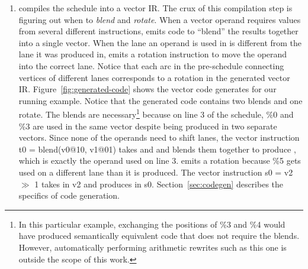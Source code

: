 \begin{enumerate}
    \item \system compiles the schedule into a vector IR. The crux of this compilation step is figuring out when to {\em blend} and {\em rotate}. When a vector operand requires values from several different instructions, \system emits code to ``blend'' the results together into a single vector.
    When the lane an operand is used in is different from the lane it was produced in, \system emits a rotation instruction to move the operand into the correct lane. Notice that each arc in the pre-schedule connecting vertices of different lanes corresponds to a rotation in the generated vector IR.
    Figure~\ref{fig:generated-code} shows the vector code \system generates for our running example.
    Notice that the generated code contains two blends and one rotate.
    The blends are necessary\footnote{In this particular example, exchanging the positions of {\sf \%3} and {\sf \%4} would have produced semantically equivalent code that does not require the blends. However, automatically performing arithmetic rewrites such as this one is outside the scope of this work.} because on line 3 of the schedule, {\sf \%0} and {\sf \%3} are used in the same vector despite being produced in two separate vectors. 
    Since none of the operands need to shift lanes, the vector instruction {\sf t0 = blend(v0@10, v1@01)} takes {\sf [\%0, \%4]} and {\sf [\%1, \%3]} and blends them together to produce {\sf [\%0, \%3]}, which is exactly the operand used on line 3. 
    \system emits a rotation because {\sf \%5} gets used on a different lane than it is produced.
    The vector instruction {\sf s0 = v2 $\gg$ 1} takes {\sf [\%2, \%5]} in {\sf v2} and produces {\sf [\%5, \%2]} in {\sf s0}.
    Section~\ref{sec:codegen} describes the specifics of code generation.
\end{enumerate}


